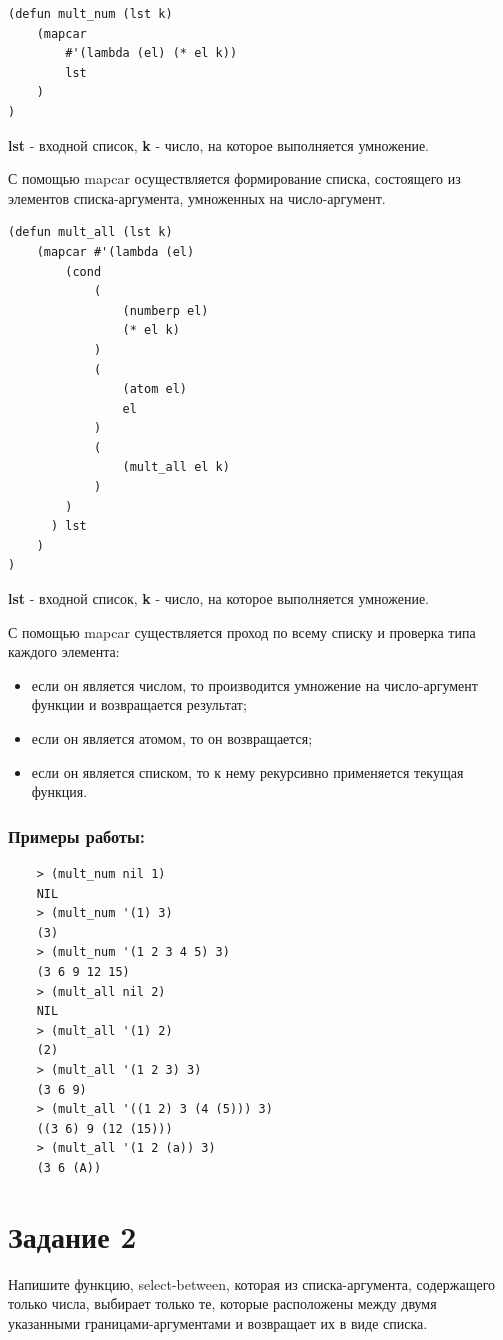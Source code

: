 \documentclass[a4paper, 12pt]{article}
\begin{document}
\begin{lstlisting}[caption=Функция умножения для списка из чисел]
(defun mult_num (lst k)
	(mapcar 
		#'(lambda (el) (* el k))
		lst
	)
)
\end{lstlisting}
\textbf{lst} - входной список, \textbf{k} - число, на которое выполняется умножение.

С помощью mapcar осуществляется формирование списка, состоящего из элементов списка-аргумента, умноженных на число-аргумент.

\begin{lstlisting}[caption=Функция умножения для списка из любых объектов]
(defun mult_all (lst k)
	(mapcar #'(lambda (el)
		(cond
			(
				(numberp el)
				(* el k)
			)
			(
				(atom el)
				el
			)
			(
				(mult_all el k)
			)
		)
	  ) lst
	)
)
\end{lstlisting}
\textbf{lst} - входной список, \textbf{k} - число, на которое выполняется умножение.

С помощью mapcar существляется проход по всему списку и проверка типа каждого элемента: 
\begin{itemize}
	\item если он является числом, то производится умножение на число-аргумент функции и возвращается результат;
	\item если он является атомом, то он возвращается;
	\item если он является списком, то к нему рекурсивно применяется текущая функция.
\end{itemize}

\subsubsection*{Примеры работы:}
\begin{lstlisting}
	> (mult_num nil 1)
	NIL
	> (mult_num '(1) 3)
	(3)
	> (mult_num '(1 2 3 4 5) 3)
	(3 6 9 12 15)
	> (mult_all nil 2)
	NIL
	> (mult_all '(1) 2)
	(2)
	> (mult_all '(1 2 3) 3)
	(3 6 9)
	> (mult_all '((1 2) 3 (4 (5))) 3)
	((3 6) 9 (12 (15)))
	> (mult_all '(1 2 (a)) 3)
	(3 6 (A))
\end{lstlisting}
\section*{Задание 2}
Напишите функцию, select-between, которая из списка-аргумента, содержащего только числа, выбирает только те, которые расположены между двумя указанными границами-аргументами и возвращает их в виде списка.
\end{document}
